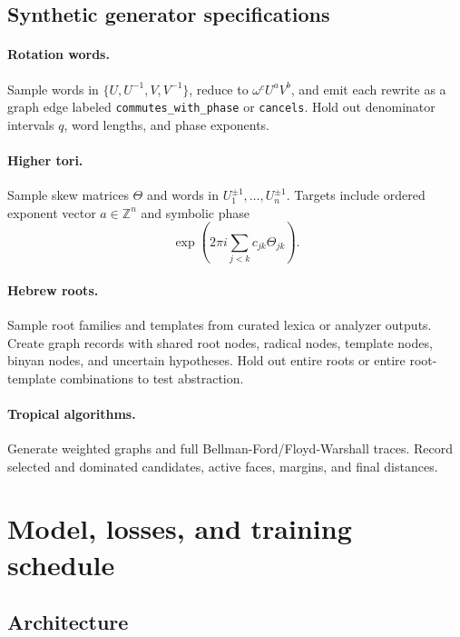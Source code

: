 \documentclass[11pt]{article}
\theoremstyle{definition}
\theoremstyle{plain}
\theoremstyle{remark}
\numberwithin{equation}{section}
\newcommand{\Z}{\mathbb{Z}}
\begin{document}
\subsection{Synthetic generator specifications}

\paragraph{Rotation words.}
Sample words in $\{U,U^{-1},V,V^{-1}\}$, reduce to $\omega^cU^aV^b$, and emit each rewrite as a graph edge labeled \texttt{commutes\_with\_phase} or \texttt{cancels}.  Hold out denominator intervals $q$, word lengths, and phase exponents.

\paragraph{Higher tori.}
Sample skew matrices $\Theta$ and words in $U_1^{\pm1},\ldots,U_n^{\pm1}$.  Targets include ordered exponent vector $a\in\Z^n$ and symbolic phase
\begin{equation}
  \exp\left(2\pi i\sum_{j<k}c_{jk}\Theta_{jk}\right).
\end{equation}

\paragraph{Hebrew roots.}
Sample root families and templates from curated lexica or analyzer outputs.  Create graph records with shared root nodes, radical nodes, template nodes, binyan nodes, and uncertain hypotheses.  Hold out entire roots or entire root-template combinations to test abstraction.

\paragraph{Tropical algorithms.}
Generate weighted graphs and full Bellman-Ford/Floyd-Warshall traces.  Record selected and dominated candidates, active faces, margins, and final distances.

\section{Model, losses, and training schedule}

\subsection{Architecture}
\end{document}
